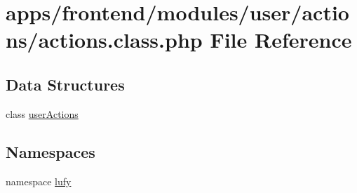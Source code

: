\hypertarget{frontend_2modules_2user_2actions_2actions_8class_8php}{\section{apps/frontend/modules/user/actions/actions.class.\-php File Reference}
\label{frontend_2modules_2user_2actions_2actions_8class_8php}
}
\subsection*{Data Structures}
\begin{DoxyCompactItemize}
\item 
class \hyperlink{classuser_actions}{user\-Actions}
\end{DoxyCompactItemize}
\subsection*{Namespaces}
\begin{DoxyCompactItemize}
\item 
namespace \hyperlink{namespacelufy}{lufy}
\end{DoxyCompactItemize}
